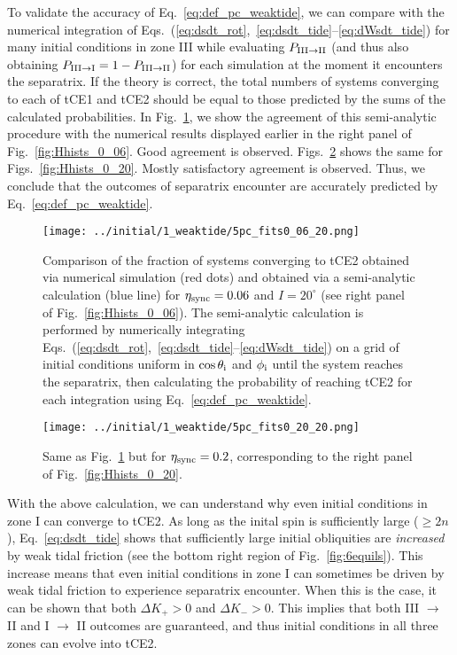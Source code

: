 \documentclass[
        fleqn,
        usenatbib,
    ]{mnras}
\begin{document}
To validate the accuracy of Eq.~\eqref{eq:def_pc_weaktide}, we can compare with
the numerical integration of
Eqs.~(\ref{eq:dsdt_rot},~\ref{eq:dsdt_tide}--\ref{eq:dWsdt_tide}) for many
initial conditions in zone III while evaluating $P_{\rm III \to II}$ (and thus
also obtaining $P_{\rm III \to I} = 1 - P_{\rm III \to II}$) for each simulation
at the moment it encounters the separatrix. If the theory is correct, the total
numbers of systems converging to each of tCE1 and tCE2 should be equal to those
predicted by the sums of the calculated probabilities. In
Fig.~\ref{fig:pc_fits_0_06}, we show the agreement of this semi-analytic
procedure with the numerical results displayed earlier in the right panel of
Fig.~\ref{fig:Hhists_0_06}. Good agreement is observed.
Figs.~\ref{fig:pc_fits_0_20} shows the same for Figs.~\ref{fig:Hhists_0_20}.
Mostly satisfactory agreement is observed. Thus, we conclude that the outcomes
of separatrix encounter are accurately predicted by
Eq.~\eqref{eq:def_pc_weaktide}.
\begin{figure}
    \centering
    \texttt{[image: ../initial/1\_weaktide/5pc\_fits0\_06\_20.png]}
    \caption{Comparison of the fraction of systems converging to tCE2 obtained
    via numerical simulation (red dots) and obtained via a semi-analytic
    calculation (blue line) for $\eta_{\rm sync} = 0.06$ and $I = 20^\circ$ (see
    right panel of Fig.~\ref{fig:Hhists_0_06}). The semi-analytic calculation is
    performed by numerically integrating
    Eqs.~(\ref{eq:dsdt_rot},~\ref{eq:dsdt_tide}--\ref{eq:dWsdt_tide}) on a grid
    of initial conditions uniform in $\cos \theta_{\rm i}$ and $\phi_{\rm i}$
    until the system reaches the separatrix, then calculating the probability of
    reaching tCE2 for each integration using
    Eq.~\eqref{eq:def_pc_weaktide}.}\label{fig:pc_fits_0_06}
\end{figure}
\begin{figure}
    \centering
    \texttt{[image: ../initial/1\_weaktide/5pc\_fits0\_20\_20.png]}
    \caption{Same as Fig.~\ref{fig:pc_fits_0_06} but for $\eta_{\rm sync} =
    0.2$, corresponding to the right panel of
    Fig.~\ref{fig:Hhists_0_20}.}\label{fig:pc_fits_0_20}
\end{figure}

With the above calculation, we can understand why even initial conditions in
zone I can converge to tCE2. As long as the inital spin is sufficiently large
($\geq 2n$), Eq.~\eqref{eq:dsdt_tide} shows that sufficiently large initial
obliquities are \emph{increased} by weak tidal friction (see the bottom right
region of Fig.~\ref{fig:6equils}). This increase means that even initial
conditions in zone I can sometimes be driven by weak tidal friction to
experience separatrix encounter. When this is the case, it can be shown that
both $\Delta K_+ > 0$ and $\Delta K_- > 0$. This implies that both III $\to$ II
and I $\to$ II outcomes are guaranteed, and thus initial conditions in all three
zones can evolve into tCE2.
\end{document}
